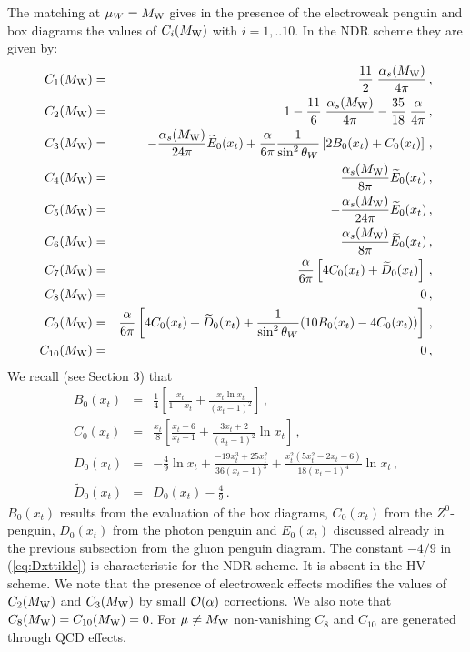 \documentclass[12pt,rotate]{article}
\def\as{\alpha_s}
\newcommand{\mw}{M_{\rm W}}
\newcommand{\aem}{\alpha}
\newcommand{\ord}{{\cal O}}
\begin{document}
\begin{itemize}
\begin{itemize}
The matching at $\mu_W=\mw$ gives in the presence of the electroweak
penguin and box diagrams the values of $C_i(\mw)$ with
 $i=1,..10$. In the NDR scheme they are given by:
\begin{eqnarray}
C_1(\mw) &=&     \frac{11}{2} \; \frac{\as(\mw)}{4\pi} \, ,
\label{eq:CMw1} \\
C_2(\mw) &=& 1 - \frac{11}{6} \; \frac{\as(\mw)}{4\pi}
               - \frac{35}{18} \; \frac{\aem}{4\pi} \, ,
\label{eq:CMw2} \\
C_3(\mw) &=& -\frac{\as(\mw)}{24\pi} \widetilde{E}_0(x_t)
             +\frac{\aem}{6\pi} \frac{1}{\sin^2\theta_W}
             \left[ 2 B_0(x_t) + C_0(x_t) \right] \, , 
\label{eq:CMw3} \\
C_4(\mw) &=& \frac{\as(\mw)}{8\pi} \widetilde{E}_0(x_t) \, ,
\label{eq:CMw4} \\
C_5(\mw) &=& -\frac{\as(\mw)}{24\pi} \widetilde{E}_0(x_t) \, ,
\label{eq:CMw5} \\
C_6(\mw) &=& \frac{\as(\mw)}{8\pi} \widetilde{E}_0(x_t) \, ,
\label{eq:CMw6} \\
C_7(\mw) &=& \frac{\aem}{6\pi} \left[ 4 C_0(x_t) + \widetilde{D}_0(x_t)
\right]\, ,
\label{eq:CMw7} \\
C_8(\mw) &=& 0 \, ,
\label{eq:CMw8} \\
C_9(\mw) &=& \frac{\aem}{6\pi} \left[ 4 C_0(x_t) + \widetilde{D}_0(x_t) +
             \frac{1}{\sin^2\theta_W} (10 B_0(x_t) - 4 C_0(x_t)) \right] \, ,
\label{eq:CMw9} \\
C_{10}(\mw) &=& 0 \, ,
\label{eq:CMw10}
\end{eqnarray}
We recall (see Section 3) that
\begin{eqnarray}
B_0(x_t) &=& \frac{1}{4} \left[ \frac{x_t}{1-x_t} 
+ \frac{x_t \ln x_t}{(x_t-1)^2}
\right]\, , \label{eq:Bxt} \\
C_0(x_t) &=& \frac{x_t}{8} \left[\frac{x_t-6}{x_t-1} 
+ \frac{3 x_t + 2}{(x_t-1)^2}
\ln x_t \right]\, ,
\label{eq:Cxt} \\
D_0(x_t) &=& -\frac{4}{9} \ln x_t + 
\frac{-19 x_t^3 + 25 x_t^2}{36 (x_t-1)^3} +
\frac{x_t^2 (5 x_t^2 - 2 x_t - 6)}{18 (x_t-1)^4} \ln x_t \, ,
\label{eq:Dxt} \\
\widetilde{D}_0(x_t) &=& D_0(x_t) - \frac{4}{9} \, .
\label{eq:Dxttilde} 
\end{eqnarray}
$B_0(x_t)$
results from the evaluation of the box diagrams, $C_0(x_t)$ from the
$Z^0$-penguin, $D_0(x_t)$ from the photon penguin and $E_0(x_t)$ 
discussed already in the previous subsection 
from the gluon penguin diagram.
The constant $-4/9$ in (\ref{eq:Dxttilde})
is characteristic for the NDR scheme. It is absent in the HV scheme.
We note that the presence of electroweak effects modifies the
values of $C_2(\mw)$ and $C_3(\mw)$ by small $\ord(\alpha)$ corrections.
We also note that $C_8(\mw)=C_{10}(\mw)=0$. For $\mu\not=\mw$ non-vanishing
$C_8$ and $C_{10}$ are generated through QCD effects.


\end{itemize}
\end{itemize}
\end{document}
